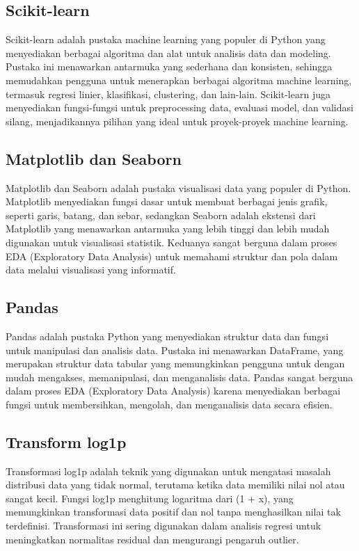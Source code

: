 \subsection{Scikit-learn}
Scikit-learn adalah pustaka machine learning yang populer di Python yang menyediakan berbagai algoritma dan alat untuk analisis data dan modeling. Pustaka ini menawarkan antarmuka yang sederhana dan konsisten, sehingga memudahkan pengguna untuk menerapkan berbagai algoritma machine learning, termasuk regresi linier, klasifikasi, clustering, dan lain-lain. Scikit-learn juga menyediakan fungsi-fungsi untuk preprocessing data, evaluasi model, dan validasi silang, menjadikannya pilihan yang ideal untuk proyek-proyek machine learning.

\subsection{Matplotlib dan Seaborn}

Matplotlib dan Seaborn adalah pustaka visualisasi data yang populer di Python. Matplotlib menyediakan fungsi dasar untuk membuat berbagai jenis grafik, seperti garis, batang, dan sebar, sedangkan Seaborn adalah ekstensi dari Matplotlib yang menawarkan antarmuka yang lebih tinggi dan lebih mudah digunakan untuk visualisasi statistik. Keduanya sangat berguna dalam proses EDA (Exploratory Data Analysis) untuk memahami struktur dan pola dalam data melalui visualisasi yang informatif.

\subsection{Pandas}

Pandas adalah pustaka Python yang menyediakan struktur data dan fungsi untuk manipulasi dan analisis data. Pustaka ini menawarkan DataFrame, yang merupakan struktur data tabular yang memungkinkan pengguna untuk dengan mudah mengakses, memanipulasi, dan menganalisis data. Pandas sangat berguna dalam proses EDA (Exploratory Data Analysis) karena menyediakan berbagai fungsi untuk membersihkan, mengolah, dan menganalisis data secara efisien.

\subsection{Transform log1p}
Transformasi log1p adalah teknik yang digunakan untuk mengatasi masalah distribusi data yang tidak normal, terutama ketika data memiliki nilai nol atau sangat kecil. Fungsi log1p menghitung logaritma dari (1 + x), yang memungkinkan transformasi data positif dan nol tanpa menghasilkan nilai tak terdefinisi. Transformasi ini sering digunakan dalam analisis regresi untuk meningkatkan normalitas residual dan mengurangi pengaruh outlier.

